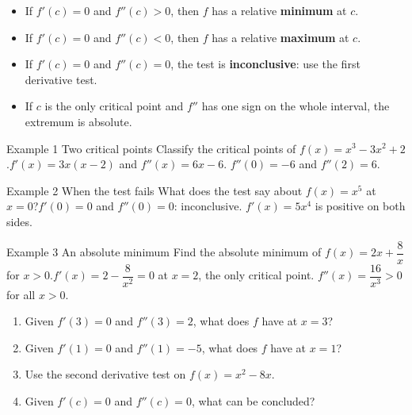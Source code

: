 \documentclass[11pt]{article}
\begin{document}

\begin{ideabox}
\begin{itemize}[leftmargin=*,itemsep=2pt,topsep=2pt]
  \item If $f'(c)=0$ and $f''(c)>0$, then $f$ has a relative \textbf{minimum} at $c$.
  \item If $f'(c)=0$ and $f''(c)<0$, then $f$ has a relative \textbf{maximum} at $c$.
  \item If $f'(c)=0$ and $f''(c)=0$, the test is \textbf{inconclusive}: use the first derivative test.
  \item If $c$ is the only critical point and $f''$ has one sign on the whole interval, the extremum is absolute.
\end{itemize}
\end{ideabox}

\begin{example}{Example 1 \textperiodcentered{} Two critical points}
Classify the critical points of $f(x)=x^3-3x^2+2$.\soln $f'(x)=3x(x-2)$ and $f''(x)=6x-6$. $f''(0)=-6$ and $f''(2)=6$.
\end{example}

\begin{example}{Example 2 \textperiodcentered{} When the test fails}
What does the test say about $f(x)=x^5$ at $x=0$?\soln $f'(0)=0$ and $f''(0)=0$: inconclusive. $f'(x)=5x^4$ is positive on both sides.
\end{example}

\begin{example}{Example 3 \textperiodcentered{} An absolute minimum}
Find the absolute minimum of $f(x)=2x+\dfrac8x$ for $x>0$.\soln $f'(x)=2-\dfrac{8}{x^2}=0$ at $x=2$, the only critical point. $f''(x)=\dfrac{16}{x^3}>0$ for all $x>0$.
\end{example}

\newpage
{}

\begin{enumerate}[leftmargin=*,itemsep=2pt]
  \item Given $f'(3)=0$ and $f''(3)=2$, what does $f$ have at $x=3$?\work{2.3cm}
  \item Given $f'(1)=0$ and $f''(1)=-5$, what does $f$ have at $x=1$?\work{2.3cm}
  \item Use the second derivative test on $f(x)=x^2-8x$.\work{2.3cm}
  \item Given $f'(c)=0$ and $f''(c)=0$, what can be concluded?\work{2.3cm}
\end{enumerate}
\end{document}
